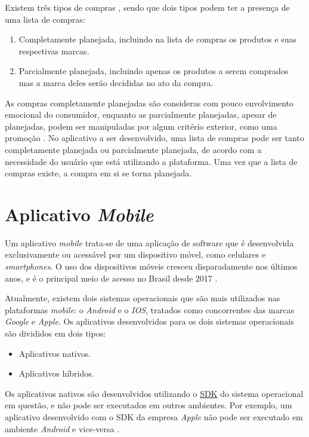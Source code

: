 Existem três tipos de compras \cite{ComprasNaoPlanejadas}, sendo que dois tipos podem ter a presença de uma lista de compras:
\begin{enumerate}
\item Completamente planejada, incluindo na lista de compras os produtos e suas respectivas marcas.
\item Parcialmente planejada, incluindo apenas os produtos a serem comprados mas a marca deles serão decididas no ato da compra.
\end{enumerate}

As compras completamente planejadas são consideras com pouco envolvimento emocional do consumidor, enquanto as parcialmente planejadas, apesar de planejadas, podem ser manipuladas por algum critério exterior, como uma promoção \cite{ComprasNaoPlanejadas}. No aplicativo a ser desenvolvido, uma lista de compras pode ser tanto completamente planejada ou parcialmente planejada, de acordo com a necessidade do usuário que está utilizando a plataforma. Uma vez que a lista de compras existe, a compra em si se torna planejada.

\section{Aplicativo \textit{Mobile}}
Um aplicativo \textit{mobile} trata-se de uma aplicação de software que é desenvolvida exclusivamente ou acessável por um dispositivo móvel, como celulares e \textit{smartphones}. O uso dos dispositivos móveis cresceu disparadamente nos últimos anos, e é o principal meio de acesso no Brasil desde 2017 \cite{Celular}.

Atualmente, existem dois sistemas operacionais que são mais utilizados nas plataformas \textit{mobile}: o \textit{Android} e o \textit{IOS}, tratados como concorrentes das marcas \textit{Google} e \textit{Apple}. Os aplicativos desenvolvidos para os dois sistemas operacionais são divididos em dois tipos:
\begin{itemize}
\item Aplicativos nativos.
\item Aplicativos híbridos.
\end{itemize}

Os aplicativos nativos são desenvolvidos utilizando o \label{sig:SDK}\hyperlink{s:SDK}{SDK} do sistema operacional em questão, e não pode ser executados em outros ambientes. Por exemplo, um aplicativo desenvolvido com o SDK da empresa \textit{Apple} não pode ser executado em ambiente \textit{Android} e vice-versa \cite{MobileApps}.

